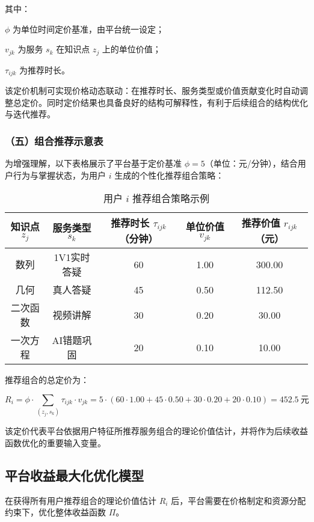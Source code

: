 其中：

$\phi$ 为单位时间定价基准，由平台统一设定；

$v_{jk}$ 为服务 $s_k$ 在知识点 $z_j$ 上的单位价值；

$\tau_{ijk}$ 为推荐时长。

该定价机制可实现价格动态联动：在推荐时长、服务类型或价值贡献变化时自动调整总定价。同时定价结果也具备良好的结构可解释性，有利于后续组合的结构优化与迭代推荐。

\subsubsection*{（五）组合推荐示意表}

为增强理解，以下表格展示了平台基于定价基准 $\phi = 5$（单位：元/分钟），结合用户行为与掌握状态，为用户 $i$ 生成的个性化推荐组合策略：

\begin{table}[!h]
\centering
\caption{用户 $i$ 推荐组合策略示例}
\begin{tabular}{c c c c c}
\toprule
知识点 $z_j$ & 服务类型 $s_k$ & 推荐时长 $\tau_{ijk}$（分钟） & 单位价值 $v_{jk}$ & 推荐价值 $r_{ijk}$（元） \\
\midrule
数列 & 1V1实时答疑 & 60 & 1.00 & 300.00 \\
几何 & 真人答疑 & 45 & 0.50 & 112.50 \\
二次函数 & 视频讲解 & 30 & 0.20 & 30.00 \\
一次方程 & AI错题巩固 & 20 & 0.10 & 10.00 \\
\bottomrule
\end{tabular}
\label{tab:combo_example}
\end{table}

推荐组合的总定价为：

\begin{equation}
R_i = \phi \cdot \sum_{(z_j, s_k)} \tau_{ijk} \cdot v_{jk} = 5 \cdot (60 \cdot 1.00 + 45 \cdot 0.50 + 30 \cdot 0.20 + 20 \cdot 0.10) = 452.5 \ \text{元}
\end{equation}

该定价代表平台依据用户特征所推荐服务组合的理论价值估计，并将作为后续收益函数优化的重要输入变量。

\subsection{平台收益最大化优化模型}
\label{sec:sub_收益最大化}

在获得所有用户推荐组合的理论价值估计 $R_i$ 后，平台需要在价格制定和资源分配约束下，优化整体收益函数 $\Pi$。

